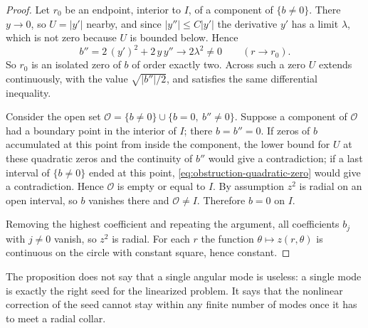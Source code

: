 \begin{proof}
Let $r_0$ be an endpoint, interior to $I$, of a component of
$\{b\ne0\}$. There $y\to0$, so $U=|y'|$ nearby, and since
$|y''|\le C|y'|$ the derivative $y'$ has a limit $\lambda$, which is
not zero because $U$ is bounded below. Hence
\begin{equation}\label{eq:obstruction-quadratic-zero}
 b''=2\,(y')^2+2\,y\,y''\longrightarrow2\lambda^2\ne0
 \qquad(r\to r_0).
\end{equation}
So $r_0$ is an isolated zero of $b$ of order exactly two. Across such
a zero $U$ extends continuously, with the value $\sqrt{|b''|/2}$, and
satisfies the same differential inequality.

Consider the open set
$\mathcal O=\{b\ne0\}\cup\{b=0,\ b''\ne0\}$. Suppose a component of
$\mathcal O$ had a boundary point in the interior of $I$; there
$b=b''=0$. If zeros of $b$ accumulated at this point from inside the
component, the lower bound for $U$ at these quadratic zeros and the
continuity of $b''$ would give a contradiction; if a last interval
of $\{b\ne0\}$ ended at this point,
\eqref{eq:obstruction-quadratic-zero} would give a contradiction.
Hence $\mathcal O$ is empty or equal to $I$. By assumption $z^2$ is
radial on an open interval, so $b$ vanishes there and
$\mathcal O\ne I$. Therefore $b=0$ on $I$.

Removing the highest coefficient and repeating the argument, all
coefficients $b_j$ with $j\ne0$ vanish, so $z^2$ is radial. For each
$r$ the function $\theta\mapsto z(r,\theta)$ is continuous on the
circle with constant square, hence constant.
\end{proof}

The proposition does not say that a single angular mode is useless: a
single mode is exactly the right seed for the linearized problem. It
says that the nonlinear correction of the seed cannot stay within any
finite number of modes once it has to meet a radial collar.
